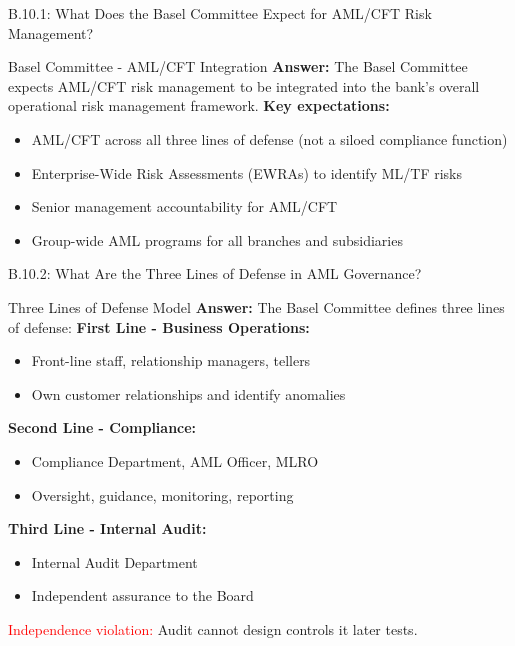 \documentclass{beamer}
\begin{document}
	\begin{frame}{B.10.1: What Does the Basel Committee Expect for AML/CFT Risk Management?}
		\begin{block}{Basel Committee - AML/CFT Integration}
			\textbf{Answer:} The Basel Committee expects AML/CFT risk management to be integrated into the bank's overall operational risk management framework.
			\vspace{0.2cm}
			\textbf{Key expectations:}
			\begin{itemize}
				\item AML/CFT across all three lines of defense (not a siloed compliance function)
				\item Enterprise-Wide Risk Assessments (EWRAs) to identify ML/TF risks
				\item Senior management accountability for AML/CFT
				\item Group-wide AML programs for all branches and subsidiaries
			\end{itemize}
		\end{block}
	\end{frame}
	
	\begin{frame}{B.10.2: What Are the Three Lines of Defense in AML Governance?}
		\begin{block}{Three Lines of Defense Model}
			\textbf{Answer:} The Basel Committee defines three lines of defense:
			\vspace{0.2cm}
			\textbf{First Line - Business Operations:}
			\begin{itemize}
				\item Front-line staff, relationship managers, tellers
				\item Own customer relationships and identify anomalies
			\end{itemize}
			\textbf{Second Line - Compliance:}
			\begin{itemize}
				\item Compliance Department, AML Officer, MLRO
				\item Oversight, guidance, monitoring, reporting
			\end{itemize}
			\textbf{Third Line - Internal Audit:}
			\begin{itemize}
				\item Internal Audit Department
				\item Independent assurance to the Board
			\end{itemize}
			\textcolor{red}{Independence violation:} Audit cannot design controls it later tests.
		\end{block}
	\end{frame}
	
\end{document}
